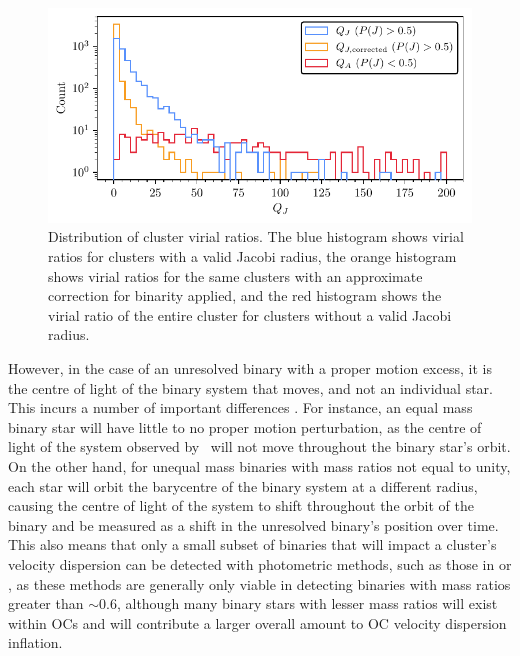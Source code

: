 \begin{figure}[t]
    \centering
    \includegraphics[width=\textwidth]{fig/c4/results_q_distribution.pdf}
    \caption[Distribution of cluster virial ratios]{Distribution of cluster virial ratios. The blue histogram shows virial ratios for clusters with a valid Jacobi radius, the orange histogram shows virial ratios for the same clusters with an approximate correction for binarity applied, and the red histogram shows the virial ratio of the entire cluster for clusters without a valid Jacobi radius.}
    \label{fig:dynamics:results:virial_ratio_distribution}
\end{figure}

However, in the case of an unresolved binary with a proper motion excess, it is the centre of light of the binary system that moves, and not an individual star. This incurs a number of important differences \citep{penoyre_binary_2020}. For instance, an equal mass binary star will have little to no proper motion perturbation, as the centre of light of the system observed by \gaia\ will not move throughout the binary star's orbit. On the other hand, for unequal mass binaries with mass ratios not equal to unity, each star will orbit the barycentre of the binary system at a different radius, causing the centre of light of the system to shift throughout the orbit of the binary and be measured as a shift in the unresolved binary's position over time. This also means that only a small subset of binaries that will impact a cluster's velocity dispersion can be detected with photometric methods, such as those in \cite{cordoni_photometric_binaries_2023} or \cite{donada_multiplicity_fraction_2023}, as these methods are generally only viable in detecting binaries with mass ratios greater than $\sim0.6$, although many binary stars with lesser mass ratios will exist within OCs and will contribute a larger overall amount to OC velocity dispersion inflation.


